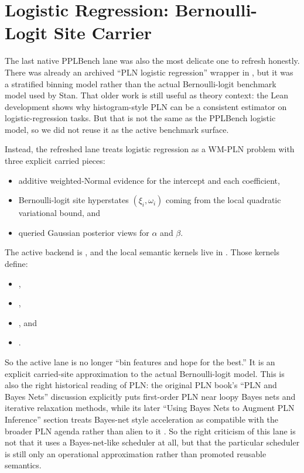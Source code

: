 \documentclass[11pt,openany]{report}
\begin{document}
\chapter{Logistic Regression: Bernoulli-Logit Site Carrier}
\label{app:pplbench-logistic-regression}

The last native PPLBench lane was also the most delicate one to refresh
honestly.  There was already an archived ``PLN logistic regression'' wrapper in
, but it was a
stratified binning model rather than the actual Bernoulli-logit benchmark model
used by Stan.  That older work is still useful as theory context: the Lean
 development shows why histogram-style PLN can be a
consistent estimator on logistic-regression tasks.  But that is not the same as
the PPLBench logistic model, so we did not reuse it as the active benchmark
surface.

Instead, the refreshed lane treats logistic regression as a WM-PLN problem with
three explicit carried pieces:
\begin{itemize}
\item additive weighted-Normal evidence for the intercept and each coefficient,
\item Bernoulli-logit site hyperstates \((\xi_i, \omega_i)\) coming from the
local quadratic variational bound, and
\item queried Gaussian posterior views for \(\alpha\) and \(\beta\).
\end{itemize}
The active backend is
, and the local semantic
kernels live in
.
Those kernels define:
\begin{itemize}
\item {},
\item {},
\item {}, and
\item {}.
\end{itemize}
So the active lane is no longer ``bin features and hope for the best.''  It is
an explicit carried-site approximation to the actual Bernoulli-logit model.
This is also the right historical reading of PLN: the original PLN book's
``PLN and Bayes Nets'' discussion explicitly puts first-order PLN near loopy
Bayes nets and iterative relaxation methods, while its later ``Using Bayes
Nets to Augment PLN Inference'' section treats Bayes-net style acceleration as
compatible with the broader PLN agenda rather than alien to it
\cite[Sec.~1.6.3]{goertzel2009pln}\cite[Sec.~9.4]{goertzel2009pln}.  So the
right criticism of this lane is not that it uses a Bayes-net-like scheduler at
all, but that the particular scheduler is still only an operational
approximation rather than promoted reusable semantics.
\end{document}

